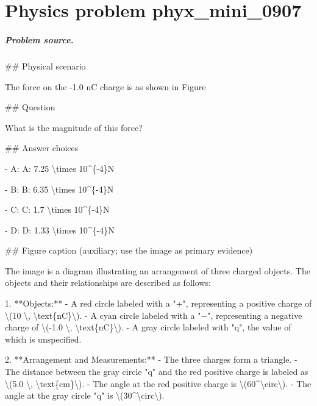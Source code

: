 
\chapter{Physics problem phyx\_mini\_0907}
\label{ch:PhyXMiniProblems_problem_phyx_mini_0907}

\paragraph{Problem source.}
\#\# Physical scenario

The force on the -1.0 nC charge is as shown in Figure

\#\# Question

What is the magnitude of this force?

\#\# Answer choices

- A: A: 7.25 \textbackslash{}times 10\textasciicircum{}\{-4\}N

- B: B: 6.35 \textbackslash{}times 10\textasciicircum{}\{-4\}N

- C: C: 1.7 \textbackslash{}times 10\textasciicircum{}\{-4\}N

- D: D: 1.33 \textbackslash{}times 10\textasciicircum{}\{-4\}N

\#\# Figure caption (auxiliary; use the image as primary evidence)

The image is a diagram illustrating an arrangement of three charged objects. The objects and their relationships are described as follows:

1. **Objects:**
   - A red circle labeled with a "+", representing a positive charge of \textbackslash{}(10 \textbackslash{}, \textbackslash{}text\{nC\}\textbackslash{}).
   - A cyan circle labeled with a "−", representing a negative charge of \textbackslash{}(-1.0 \textbackslash{}, \textbackslash{}text\{nC\}\textbackslash{}).
   - A gray circle labeled with "q", the value of which is unspecified.

2. **Arrangement and Measurements:**
   - The three charges form a triangle.
   - The distance between the gray circle "q" and the red positive charge is labeled as \textbackslash{}(5.0 \textbackslash{}, \textbackslash{}text\{cm\}\textbackslash{}).
   - The angle at the red positive charge is \textbackslash{}(60\textasciicircum{}\textbackslash{}circ\textbackslash{}).
   - The angle at the gray circle "q" is \textbackslash{}(30\textasciicircum{}\textbackslash{}circ\textbackslash{}).

